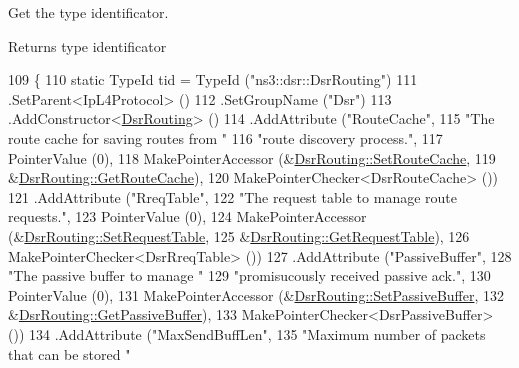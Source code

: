 Get the type identificator. 

\begin{DoxyReturn}{Returns}
type identificator 
\end{DoxyReturn}

\begin{DoxyCode}
109 \{
110   \textcolor{keyword}{static} TypeId tid = TypeId (\textcolor{stringliteral}{"ns3::dsr::DsrRouting"})
111     .SetParent<IpL4Protocol> ()
112     .SetGroupName (\textcolor{stringliteral}{"Dsr"})
113     .AddConstructor<\hyperlink{classns3_1_1dsr_1_1DsrRouting_a3b686bd293d4bd096180a1996171ccd1}{DsrRouting}> ()
114     .AddAttribute (\textcolor{stringliteral}{"RouteCache"},
115                    \textcolor{stringliteral}{"The route cache for saving routes from "}
116                    \textcolor{stringliteral}{"route discovery process."},
117                    PointerValue (0),
118                    MakePointerAccessor (&\hyperlink{classns3_1_1dsr_1_1DsrRouting_af61179a03e52ebee0822caac80a830ff}{DsrRouting::SetRouteCache},
119                                         &\hyperlink{classns3_1_1dsr_1_1DsrRouting_afa6f8c46b9d64b3a56bd78f7abb3d1ad}{DsrRouting::GetRouteCache}),
120                    MakePointerChecker<DsrRouteCache> ())
121     .AddAttribute (\textcolor{stringliteral}{"RreqTable"},
122                    \textcolor{stringliteral}{"The request table to manage route requests."},
123                    PointerValue (0),
124                    MakePointerAccessor (&\hyperlink{classns3_1_1dsr_1_1DsrRouting_a62fbce24642000a21a4e7c783f77c205}{DsrRouting::SetRequestTable},
125                                         &\hyperlink{classns3_1_1dsr_1_1DsrRouting_a86141cf3706e21637e9d97d341bd1ca9}{DsrRouting::GetRequestTable}),
126                    MakePointerChecker<DsrRreqTable> ())
127     .AddAttribute (\textcolor{stringliteral}{"PassiveBuffer"},
128                    \textcolor{stringliteral}{"The passive buffer to manage "}
129                    \textcolor{stringliteral}{"promisucously received passive ack."},
130                    PointerValue (0),
131                    MakePointerAccessor (&\hyperlink{classns3_1_1dsr_1_1DsrRouting_a10d09f5b58b469d0a7c92926f61dd9ab}{DsrRouting::SetPassiveBuffer},
132                                         &\hyperlink{classns3_1_1dsr_1_1DsrRouting_ae53372c864f32f34bc1964865a3865fe}{DsrRouting::GetPassiveBuffer}),
133                    MakePointerChecker<DsrPassiveBuffer> ())
134     .AddAttribute (\textcolor{stringliteral}{"MaxSendBuffLen"},
135                    \textcolor{stringliteral}{"Maximum number of packets that can be stored "}

\end{DoxyCode}
